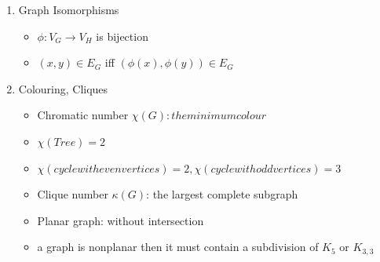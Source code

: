 \documentclass[11pt, a4paper]{article}
\begin{document}
\begin{enumerate}
\begin{itemize}
            \end{itemize}
        \item Graph Isomorphisms
            \begin{itemize}
                \item $ \phi: V_G \rightarrow V_H$ is bijection
                \item $ (x,y) \in E_G$ iff $(\phi(x), \phi(y)) \in E_G$
            \end{itemize}
        \item Colouring, Cliques
            \begin{itemize}
                \item Chromatic number $\chi (G): the minimum colour$
                \item $\chi (Tree) = 2$
                \item $\chi (cycle with even vertices) = 2, \chi (cycle with odd vertices) = 3$
                \item Clique number $ \kappa (G) $: the largest complete subgraph
                \item Planar graph: without intersection
                \item a graph is nonplanar then it must contain a subdivision of $K_5$ or $K_{3,3}$
            \end{itemize}
    \end{enumerate}
\end{document}
